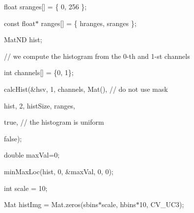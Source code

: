 {\ttfamily }

{\ttfamily float sranges\mbox{[}\mbox{]} = \{ 0, 256 \};}

{\ttfamily }

{\ttfamily }

{\ttfamily const float$\ast$ ranges\mbox{[}\mbox{]} = \{ hranges, sranges \};}

{\ttfamily }

{\ttfamily }

{\ttfamily Mat\+ND hist;}

{\ttfamily }

{\ttfamily }

{\ttfamily // we compute the histogram from the 0-\/th and 1-\/st channels}

{\ttfamily }

{\ttfamily }

{\ttfamily int channels\mbox{[}\mbox{]} = \{0, 1\};}

{\ttfamily }

{\ttfamily }

{\ttfamily calc\+Hist(\&hsv, 1, channels, Mat(), // do not use mask}

{\ttfamily }

{\ttfamily }

{\ttfamily hist, 2, hist\+Size, ranges,}

{\ttfamily }

{\ttfamily }

{\ttfamily true, // the histogram is uniform}

{\ttfamily }

{\ttfamily }

{\ttfamily false);}

{\ttfamily }

{\ttfamily }

{\ttfamily double max\+Val=0;}

{\ttfamily }

{\ttfamily }

{\ttfamily min\+Max\+Loc(hist, 0, \&max\+Val, 0, 0);}

{\ttfamily }

{\ttfamily }

{\ttfamily int scale = 10;}

{\ttfamily }

{\ttfamily }

{\ttfamily Mat hist\+Img = Mat.\+zeros(sbins$\ast$scale, hbins$\ast$10, C\+V\+\_\+U\+C3);}

{\ttfamily }

